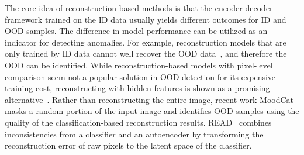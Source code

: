 \label{sec:ood_reconstruction}
The core idea of reconstruction-based methods is that the encoder-decoder framework trained on the ID data usually yields different outcomes for ID and OOD samples. The difference in model performance can be utilized as an indicator for detecting anomalies.
For example, reconstruction models that are only trained by ID data cannot well recover the OOD data~, and therefore the OOD can be identified. While reconstruction-based models with pixel-level comparison seem not a popular solution in OOD detection for its expensive training cost, reconstructing with hidden features is shown as a promising alternative~.
Rather than reconstructing the entire image, recent work MoodCat~ masks a random portion of the input image and identifies OOD samples using the quality of the classification-based reconstruction results. READ~ combines inconsistencies from a classifier and an autoencoder by transforming the reconstruction error of raw pixels to the latent space of the classifier. 


